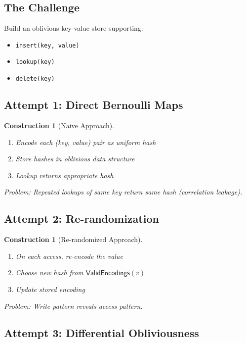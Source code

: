 \documentclass[11pt,final]{article}
\newcommand{\ValidEnc}{\mathsf{ValidEncodings}}
\newtheorem{construction}[theorem]{Construction}
\begin{document}
\subsection{The Challenge}

Build an oblivious key-value store supporting:
\begin{itemize}
    \item \texttt{insert(key, value)}
    \item \texttt{lookup(key)}
    \item \texttt{delete(key)}
\end{itemize}

\subsection{Attempt 1: Direct Bernoulli Maps}

\begin{construction}[Naive Approach]
\begin{enumerate}
    \item Encode each (key, value) pair as uniform hash
    \item Store hashes in oblivious data structure
    \item Lookup returns appropriate hash
\end{enumerate}
Problem: Repeated lookups of same key return same hash (correlation leakage).
\end{construction}

\subsection{Attempt 2: Re-randomization}

\begin{construction}[Re-randomized Approach]
\begin{enumerate}
    \item On each access, re-encode the value
    \item Choose new hash from $\ValidEnc(v)$
    \item Update stored encoding
\end{enumerate}
Problem: Write pattern reveals access pattern.
\end{construction}

\subsection{Attempt 3: Differential Obliviousness}
\end{document}
